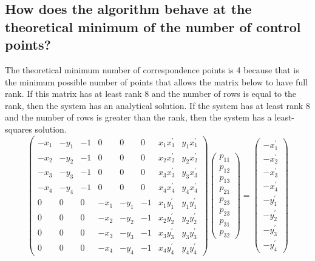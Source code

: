 \documentclass[]{article}
\begin{document}
	\subsection{How does the algorithm behave at the theoretical minimum of the number of control points?}
		The theoretical minimum number of correspondence points is 4 because that is the minimum possible number of points that allows the matrix below to have full rank. If this matrix has at least rank 8 and the number of rows is equal to the rank, then the system has an analytical solution. If the system has at least rank 8 and the number of rows is greater than the rank, then the system has a least-squares solution.
		\[\left(\begin{array}{cccccccc}
			-x_{1} & -y_{1} & -1 & 0 & 0 & 0 & x_{1} x_{1}^{\prime} & y_{1} x_{1}^{\prime} \\
			-x_{2} & -y_{2} & -1 & 0 & 0 & 0 & x_{2} x_{2}^{\prime} & y_{2} x_{2}^{\prime} \\
			-x_{3} & -y_{3} & -1 & 0 & 0 & 0 & x_{3} x_{3}^{\prime} & y_{3} x_{3}^{\prime} \\
			-x_{4} & -y_{4} & -1 & 0 & 0 & 0 & x_{4} x_{4}^{\prime} & y_{4} x_{4}^{\prime} \\
			0 & 0 & 0 & -x_{1} & -y_{1} & -1 & x_{1} y_{1}^{\prime} & y_{1} y_{1}^{\prime} \\
			0 & 0 & 0 & -x_{2} & -y_{2} & -1 & x_{2} y_{2}^{\prime} & y_{2} y_{2}^{\prime} \\
			0 & 0 & 0 & -x_{3} & -y_{3} & -1 & x_{3} y_{3}^{\prime} & y_{3} y_{3}^{\prime} \\
			0 & 0 & 0 & -x_{4} & -y_{4} & -1 & x_{4} y_{4}^{\prime} & y_{4} y_{4}^{\prime}
		\end{array}\right)\left(\begin{array}{c}
			p_{11} \\
			p_{12} \\
			p_{13} \\
			p_{21} \\
			p_{23} \\
			p_{23} \\
			p_{31} \\
			p_{32}
		\end{array}\right)=\left(\begin{array}{c}
			-x_{1}^{\prime} \\
			-x_{2}^{\prime} \\
			-x_{3}^{\prime} \\
			-x_{4}^{\prime} \\
			-y_{1}^{\prime} \\
			-y_{2}^{\prime} \\
			-y_{3}^{\prime} \\
			-y_{4}^{\prime}
		\end{array}\right)\]
\end{document}
